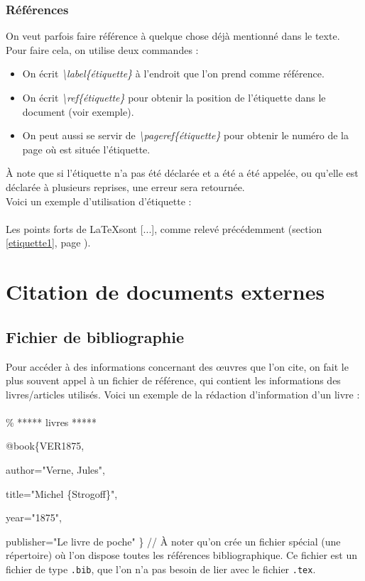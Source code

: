\documentclass[a4paper, 10pt]{book}
\begin{document}
\subsubsection{Références}
On veut parfois  faire référence à \label{etiquette1} quelque chose déjà mentionné dans le texte. Pour faire cela, on utilise deux commandes :

\begin{itemize}
\item On écrit \textit{\textbackslash label\{étiquette\}} à l'endroit que l'on prend comme référence.
\item On écrit \textit{\textbackslash ref\{étiquette\}} pour obtenir la position de l'étiquette dans le document (voir exemple).
\item On peut aussi se servir de \textit{\textbackslash pageref\{étiquette\}} pour obtenir le numéro de la page où est située l'étiquette.\\
\end{itemize}

À note que si l'étiquette n'a pas été déclarée et a été a été appelée, ou qu'elle est déclarée à plusieurs reprises, une erreur sera retournée.\\
Voici un exemple d'utilisation d'étiquette : \\ \\
Les points forts de \LaTeX sont [...], comme relevé précédemment (section \ref{etiquette1}, page \pageref{etiquette1}).

\section{Citation de documents externes}
\subsection{Fichier de bibliographie}
Pour accéder à des informations concernant des \oe uvres que l'on cite, on fait le plus souvent appel à un fichier de référence, qui contient les informations des livres/articles utilisés. Voici un exemple de la rédaction d'information d'un livre : \\ \\
\% ***** livres *****

@book\{VER1875,

   author="Verne, Jules",

   title="Michel \{Strogoff\}",

   year="1875",

   publisher="Le livre de poche"
\}
//
À noter qu'on crée un fichier spécial (une répertoire) où l'on dispose toutes les références bibliographique. Ce fichier est un fichier de type \texttt{.bib}, que l'on n'a pas besoin de lier avec le fichier \texttt{.tex}.
\end{document}
